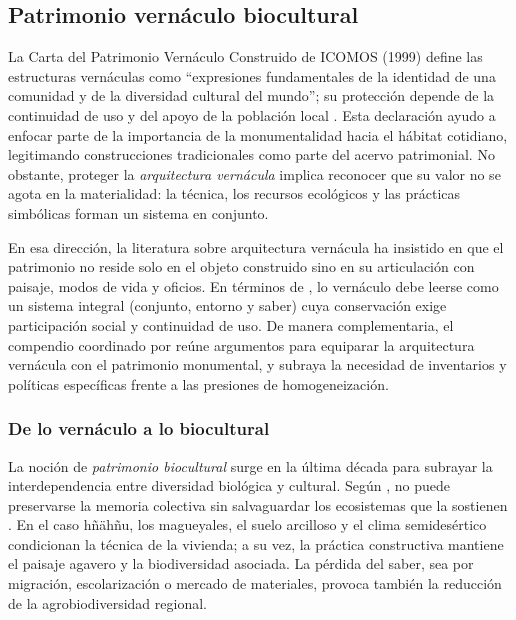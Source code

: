 \subsection{Patrimonio vernáculo biocultural}
\label{subsec:vernaculo_biocultural}

La Carta del Patrimonio Vernáculo Construido de ICOMOS (1999) define las
estructuras vernáculas como ``expresiones fundamentales de la identidad
de una comunidad y de la diversidad cultural del mundo''; su protección
depende de la continuidad de uso y del apoyo de la población local
\citep{icomos1999carta}.  Esta declaración ayudo a enfocar parte de la importancia de la
monumentalidad hacia el hábitat cotidiano, legitimando
construcciones tradicionales como parte del acervo patrimonial.  No obstante,
proteger la \emph{arquitectura vernácula} implica reconocer que su valor
no se agota en la materialidad: la técnica, los recursos ecológicos y
las prácticas simbólicas forman un sistema en conjunto.

En esa dirección, la literatura sobre arquitectura vernácula ha insistido
en que el patrimonio no reside solo en el objeto construido sino en su
articulación con paisaje, modos de vida y oficios.  En términos de
\citeauthor{torres1999revista}, lo vernáculo debe leerse como un sistema
integral (conjunto, entorno y saber) cuya conservación exige participación
social y continuidad de uso.\citep{torres1999revista}  De manera
complementaria, el compendio coordinado por \citeauthor{martin2006tomo1}
reúne argumentos para equiparar la arquitectura vernácula con el
patrimonio monumental, y subraya la necesidad de inventarios y políticas
específicas frente a las presiones de homogeneización.
\citep{martin2006tomo1}

\subsubsection{De lo vernáculo a lo biocultural}

La noción de \emph{patrimonio biocultural} surge en la última década
para subrayar la interdependencia entre diversidad biológica y cultural.
Según \citeauthor{chang2010patrimonio}, no puede preservarse la memoria
colectiva sin salvaguardar los ecosistemas que la sostienen
\citep{chang2010patrimonio}.  En el caso hñähñu, los
magueyales, el suelo arcilloso y el clima semidesértico condicionan la
técnica de la vivienda; a su vez, la práctica constructiva mantiene el
paisaje agavero y la biodiversidad asociada.  La pérdida del saber,
sea por migración, escolarización o mercado de materiales, provoca
también la reducción de la agrobiodiversidad regional.


